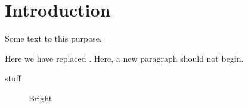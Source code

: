 \section{Introduction}

Some text  to this purpose.

Here we have replaced .
Here, a new paragraph should not begin.

\begin{table}
    \caption{stuff}
\end{table}

\begin{figure}[tb]
    \caption{Bright}
\end{figure}